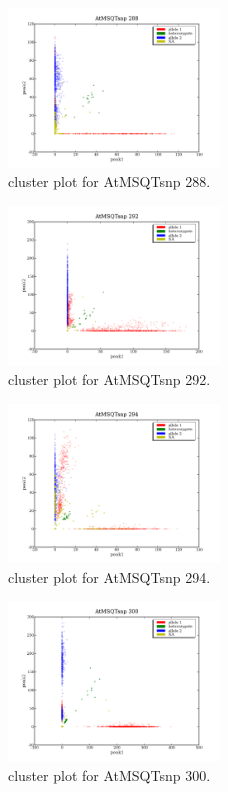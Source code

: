 \begin{figure}[H]
\includegraphics[width=0.5\textwidth]{figures/cluster_plot_AtMSQTsnp_288.png}
\caption{cluster plot for AtMSQTsnp 288.} \label{flAtMSQTsnp288}
\end{figure}

\begin{figure}[H]
\includegraphics[width=0.5\textwidth]{figures/cluster_plot_AtMSQTsnp_292.png}
\caption{cluster plot for AtMSQTsnp 292.} \label{flAtMSQTsnp292}
\end{figure}

\begin{figure}[H]
\includegraphics[width=0.5\textwidth]{figures/cluster_plot_AtMSQTsnp_294.png}
\caption{cluster plot for AtMSQTsnp 294.} \label{flAtMSQTsnp294}
\end{figure}

\begin{figure}[H]
\includegraphics[width=0.5\textwidth]{figures/cluster_plot_AtMSQTsnp_300.png}
\caption{cluster plot for AtMSQTsnp 300.} \label{flAtMSQTsnp300}
\end{figure}

